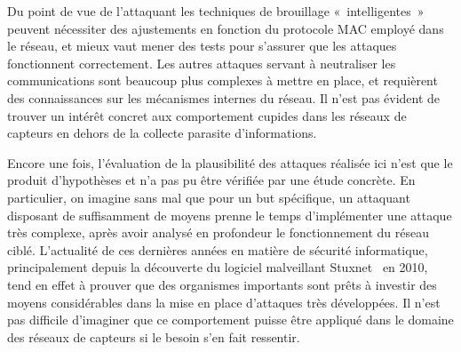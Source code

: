 Du point de vue de l'attaquant les techniques de brouillage « intelligentes » peuvent nécessiter des ajustements en fonction du protocole MAC employé dans le réseau, et mieux vaut mener des tests pour s'assurer que les attaques fonctionnent correctement.
Les autres attaques servant à neutraliser les communications sont beaucoup plus complexes à mettre en place, et requièrent des connaissances sur les mécanismes internes du réseau.
Il n'est pas évident de trouver un intérêt concret aux comportement cupides dans les réseaux de capteurs en dehors de la collecte parasite d'informations.

Encore une fois, l'évaluation de la plausibilité des attaques réalisée ici n'est que le produit d'hypothèses et n'a pas pu être vérifiée par une étude concrète.
En particulier, on imagine sans mal que pour un but spécifique, un attaquant disposant de suffisamment de moyens prenne le temps d'implémenter une attaque très complexe, après avoir analysé en profondeur le fonctionnement du réseau ciblé.
L'actualité de ces dernières années en matière de sécurité informatique, principalement depuis la découverte du logiciel malveillant Stuxnet~\cite{stuxnet} en 2010, tend en effet à prouver que des organismes importants sont prêts à investir des moyens considérables dans la mise en place d'attaques très développées.
Il n'est pas difficile d'imaginer que ce comportement puisse être appliqué dans le domaine des réseaux de capteurs si le besoin s'en fait ressentir.
